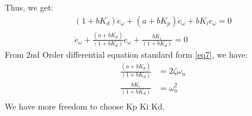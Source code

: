 \documentclass[12pt,a4paper]{article}
\begin{document}
	Thus, we get:
	\begin{equation}
		\label{eq11}
		\begin{split}
			(1+bK_d)\ddot{e}_{\omega} + (a+bK_p)\dot{e}_{\omega} + bK_ie_{\omega} = 0 \\
			\ddot{e}_{\omega} + \frac{(a+bK_p)}{(1+bK_d)}\dot{e}_{\omega} + \frac{bK_i}{(1+bK_d)} = 0
		\end{split}
	\end{equation}
	From 2nd Order differential equation standard form \autoref{eq7}, we have:
	\[
	\begin{split}
		\frac{(a+bK_p)}{(1+bK_d)} &= 2\zeta\omega_n \\
		\frac{bK_i}{(1+bK_d)}     &= \omega_n^2 \\
	\end{split}
	\]
	We have more freedom to choose Kp Ki Kd.
	
	
\end{document}
